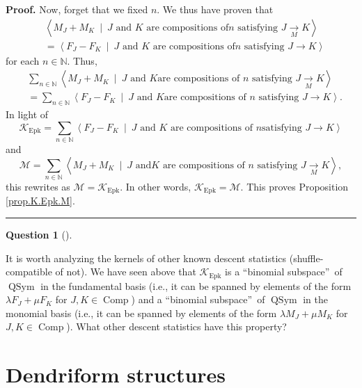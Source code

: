 \documentclass[numbers=enddot,12pt,final,onecolumn,notitlepage]{scrartcl}%
\theoremstyle{definition}
\newtheorem{quest}[theo]{Question}
\newenvironment{question}[1][]
{\begin{quest}[#1]\begin{leftbar}}
{\end{leftbar}\end{quest}}
\newenvironment{proof}[1][Proof]{\noindent\textbf{#1.} }{\ \rule{0.5em}{0.5em}}
\newenvironment{question}[1][Question]{\noindent\textbf{#1.} }{\ \rule{0.5em}{0.5em}}
\let\sumnonlimits\sum
\renewcommand{\sum}{\sumnonlimits\limits}
\begin{document}
\begin{proof}
Now, forget that we fixed $n$. We thus have proven that
\begin{align*}
&  \left\langle M_{J}+M_{K}\ \mid\ J\text{ and }K\text{ are compositions of
}n\text{ satisfying }J\underset{M}{\rightarrow}K\right\rangle \\
&  =\left\langle F_{J}-F_{K}\ \mid\ J\text{ and }K\text{ are compositions of
}n\text{ satisfying }J\rightarrow K\right\rangle
\end{align*}
for each $n\in\mathbb{N}$. Thus,%
\begin{align*}
&  \sum_{n\in\mathbb{N}}\left\langle M_{J}+M_{K}\ \mid\ J\text{ and }K\text{
are compositions of }n\text{ satisfying }J\underset{M}{\rightarrow
}K\right\rangle \\
&  =\sum_{n\in\mathbb{N}}\left\langle F_{J}-F_{K}\ \mid\ J\text{ and }K\text{
are compositions of }n\text{ satisfying }J\rightarrow K\right\rangle .
\end{align*}
In light of%
\[
\mathcal{K}_{\operatorname*{Epk}}=\sum_{n\in\mathbb{N}}\left\langle
F_{J}-F_{K}\ \mid\ J\text{ and }K\text{ are compositions of }n\text{
satisfying }J\rightarrow K\right\rangle
\]
and%
\[
\mathcal{M}=\sum_{n\in\mathbb{N}}\left\langle M_{J}+M_{K}\ \mid\ J\text{ and
}K\text{ are compositions of }n\text{ satisfying }J\underset{M}{\rightarrow
}K\right\rangle ,
\]
this rewrites as $\mathcal{M}=\mathcal{K}_{\operatorname*{Epk}}$. In other
words, $\mathcal{K}_{\operatorname*{Epk}}=\mathcal{M}$. This proves
Proposition \ref{prop.K.Epk.M}.
\end{proof}

\begin{question}
It is worth analyzing the kernels of other known descent statistics
(shuffle-compatible of not). We have seen above that $\mathcal{K}%
_{\operatorname*{Epk}}$ is a \textquotedblleft binomial
subspace\textquotedblright\ of $\operatorname*{QSym}$ in the fundamental basis
(i.e., it can be spanned by elements of the form $\lambda F_{J}+\mu F_{K}$ for
$J,K\in\operatorname*{Comp}$) and a \textquotedblleft binomial
subspace\textquotedblright\ of $\operatorname*{QSym}$ in the monomial basis
(i.e., it can be spanned by elements of the form $\lambda M_{J}+\mu M_{K}$ for
$J,K\in\operatorname*{Comp}$). What other descent statistics have this property?
\end{question}

\section{Dendriform structures}
\end{document}
